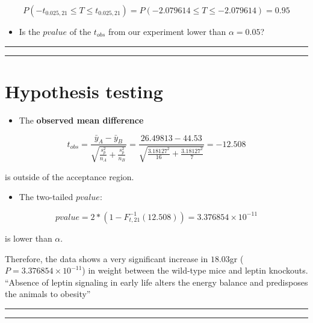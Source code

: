 \documentclass[
]{book}
\providecommand{\tightlist}{%
  \setlength{\itemsep}{0pt}\setlength{\parskip}{0pt}}
\begin{document}
\[P(-t_{0.025, 21} \leq T \leq t_{0.025, 21})=P(-2.079614 \leq T \leq -2.079614)=0.95\]

\begin{itemize}
\tightlist
\item
  Is the \(pvalue\) of the \(t_{obs}\) from our experiment lower than \(\alpha=0.05\)?
\end{itemize}

\begin{center}\rule{0.5\linewidth}{0.5pt}\end{center}

\begin{center}\rule{0.5\linewidth}{0.5pt}\end{center}

\hypertarget{hypothesis-testing-3}{%
\section{Hypothesis testing}\label{hypothesis-testing-3}}

\begin{itemize}
\tightlist
\item
  The \textbf{observed mean difference}
\end{itemize}

\[t_{obs}=\frac{\bar{y}_A-\bar{y}_B }{\sqrt{\frac{s^2_p}{n_A}+\frac{s^2_p}{n_B}}}=\frac{26.49813-44.53}{\sqrt{\frac{3.18127^2}{16}+\frac{3.18127^2}{7}}}=-12.508\]

is outside of the acceptance region.

\begin{itemize}
\tightlist
\item
  The two-tailed \(pvalue\):
\end{itemize}

\[pvalue=2*(1-F^{-1}_{t,21}(12.508))=3.376854 \times 10^{-11}\]

is lower than \(\alpha\).

Therefore, the data shows a very significant increase in \(18.03\)gr (\(P=3.376854 \times 10^{-11}\)) in weight between the wild-type mice and leptin knockouts. ``Absence of leptin signaling in early life alters the energy balance and predisposes the animals to obesity''

\begin{center}\rule{0.5\linewidth}{0.5pt}\end{center}

\begin{center}\rule{0.5\linewidth}{0.5pt}\end{center}
\end{document}
